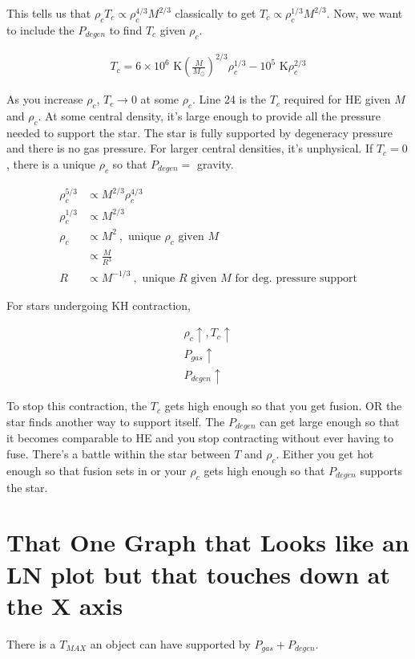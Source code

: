 \documentclass[10pt,letterpaper,final]{book}
\newcommand{\pt}{\propto}
\newcommand{\rp}{\right)}
\newcommand{\lp}{\left(}
\newcommand{\mfrac}{\lp \frac{M}{M_\odot}\rp}
\newcommand{\ra}{\rightarrow}
\begin{document}
This tells us that $\rho_c T_c \pt \rho_c ^{4/3}M^{2/3}$ classically to get $T_c \pt \rho_c^{1/3}M^{2/3}$. Now, we want to include the $P_{degen}$ to find $T_c$ given $\rho_c$. 

\begin{align}
T_c = 6 \times 10^6 \text{ K} \mfrac^{2/3}\rho_c^{1/3} - 10^5 \text{ K} \rho_c^{2/3}
\end{align}

As you increase $\rho_c$, $T_c \ra 0$ at some $\rho_c$. Line 24 is the $T_c$ required for HE given $M$ and $\rho_c$. At some central density, it's large enough to provide all the pressure needed to support the star. The star is fully supported by degeneracy pressure and there is no gas pressure. For larger central densities, it's unphysical. If $T_c = 0$, there is a unique $\rho_c$ so that $P_{degen} =$ gravity. 

\begin{align}
\rho_c^{5/3} &\pt M^{2/3} \rho_c^{4/3}\\
\rho_c^{1/3} &\pt M^{2/3}\\
\rho_c &\pt M^2~,\text{ unique $\rho_c$ given $M$}\\
&\pt \frac{M}{R^3}\\
R &\pt M^{-1/3}~,\text{ unique $R$ given $M$ for deg. pressure support}
\end{align}

For stars undergoing KH contraction,

\begin{align}
\rho_c \uparrow, T_c \uparrow\\
P_{gas} \uparrow\\
P_{degen} \uparrow
\end{align}

To stop this contraction, the $T_c$ gets high enough so that you get fusion. OR the star finds another way to support itself. The $P_{degen}$ can get large enough so that it becomes comparable to HE and you stop contracting without ever having to fuse. There's a battle within the star between $T$ and $\rho_c$. Either you get hot enough so that fusion sets in or your $\rho_c$ gets high enough so that $P_{degen}$ supports the star.

\section{That One Graph that Looks like an LN plot but that touches down at the X axis}

There is a $T_{MAX}$ an object can have supported by $P_{gas} + P_{degen}$.
\end{document}
